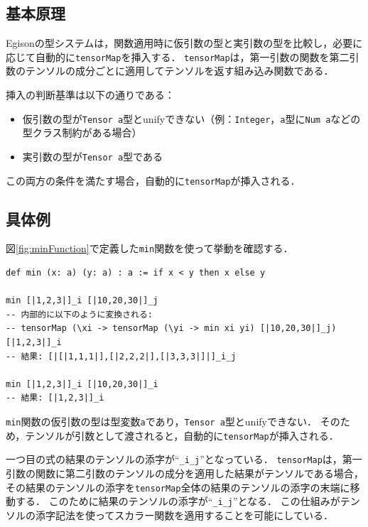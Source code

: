 \subsection{基本原理}

Egisonの型システムは，関数適用時に仮引数の型と実引数の型を比較し，必要に応じて自動的に\lstinline{tensorMap}を挿入する．
\lstinline{tensorMap}は，第一引数の関数を第二引数のテンソルの成分ごとに適用してテンソルを返す組み込み関数である．

挿入の判断基準は以下の通りである：
\begin{itemize}
\item 仮引数の型が\lstinline{Tensor a}型とunifyできない（例：\lstinline{Integer}，\lstinline{a}型に\lstinline{Num a}などの型クラス制約がある場合）
\item 実引数の型が\lstinline{Tensor a}型である
\end{itemize}

この両方の条件を満たす場合，自動的に\lstinline{tensorMap}が挿入される．

\subsection{具体例}

図\ref{fig:minFunction}で定義した\lstinline{min}関数を使って挙動を確認する．
\begin{lstlisting}[language=egison,numbers=none]
def min (x: a) (y: a) : a := if x < y then x else y

min [|1,2,3|]_i [|10,20,30|]_j
-- 内部的に以下のように変換される:
-- tensorMap (\xi -> tensorMap (\yi -> min xi yi) [|10,20,30|]_j) [|1,2,3|]_i
-- 結果: [|[|1,1,1|],[|2,2,2|],[|3,3,3|]|]_i_j

min [|1,2,3|]_i [|10,20,30|]_i
-- 結果: [|1,2,3|]_i
\end{lstlisting}

\lstinline{min}関数の仮引数の型は型変数\lstinline{a}であり，\lstinline{Tensor a}型とunifyできない．
そのため，テンソルが引数として渡されると，自動的に\lstinline{tensorMap}が挿入される．

一つ目の式の結果のテンソルの添字が``\lstinline|_i_j|''となっている．
\lstinline{tensorMap}は，第一引数の関数に第二引数のテンソルの成分を適用した結果がテンソルである場合，その結果のテンソルの添字を\lstinline{tensorMap}全体の結果のテンソルの添字の末端に移動する．
このために結果のテンソルの添字が``\lstinline|_i_j|''となる．
この仕組みがテンソルの添字記法を使ってスカラー関数を適用することを可能にしている．

